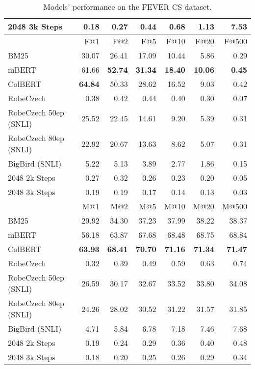 \begin{table}[!htb]
\begin{tabular}{lrrrrrr}
\nystr{} 2048 3k Steps &   0.18 &   0.27 &   0.44 &   0.68 &   1.13 &   7.53 \\
        \midrule
              {} &    F@1 &    F@2 &    F@5 &   F@10 &   F@20 &   F@500 \\
        \midrule
                  BM25 &  30.07 &  26.41 &  17.09 &  10.44 &   5.86 &    0.29 \\
                 mBERT &  61.66 &  \bf{52.74} &  \bf{31.34} &  \bf{18.40} &  \bf{10.06} &    \bf{0.45} \\
               ColBERT &  \bf{64.84} &  50.33 &  28.62 &  16.52 &   9.03 &    0.42 \\
             RobeCzech &   0.38 &   0.42 &   0.44 &   0.40 &   0.30 &    0.07 \\
 RobeCzech 50ep (SNLI) &  25.52 &  22.45 &  14.61 &   9.20 &   5.39 &    0.31 \\
 RobeCzech 80ep (SNLI) &  22.92 &  20.67 &  13.63 &   8.62 &   5.07 &    0.31 \\
        BigBird (SNLI) &   5.22 &   5.13 &   3.89 &   2.77 &   1.86 &    0.15 \\
\nystr{} 2048 2k Steps &   0.27 &   0.32 &   0.26 &   0.23 &   0.20 &    0.05 \\
\nystr{} 2048 3k Steps &   0.19 &   0.19 &   0.17 &   0.14 &   0.13 &    0.03 \\
        \midrule
              {} &  M@1 &  M@2 &  M@5 &  M@10 &  M@20 &  M@500 \\
        \midrule
                  BM25 &  29.92 &  34.30 &  37.23 &   37.99 &   38.22 &    38.37 \\
                 mBERT &  56.18 &  63.87 &  67.68 &   68.48 &   68.75 &    68.84 \\
               ColBERT &  \bf{63.93} &  \bf{68.41} &  \bf{70.70} &   \bf{71.16} &   \bf{71.34} &    \bf{71.47} \\
             RobeCzech &   0.32 &   0.39 &   0.49 &    0.59 &    0.63 &     0.74 \\
 RobeCzech 50ep (SNLI) &  26.59 &  30.17 &  32.67 &   33.52 &   33.80 &    34.08 \\
 RobeCzech 80ep (SNLI) &  24.26 &  28.02 &  30.52 &   31.22 &   31.57 &    31.85 \\
        BigBird (SNLI) &   4.71 &   5.84 &   6.78 &    7.18 &    7.46 &     7.68 \\
\nystr{} 2048 2k Steps &   0.19 &   0.24 &   0.29 &    0.36 &    0.40 &     0.48 \\
\nystr{} 2048 3k Steps &   0.18 &   0.20 &   0.25 &    0.26 &    0.29 &     0.34 \\
        \bottomrule
        \end{tabular}
    \caption[FEVER CS Metrics]{Models' performance on the FEVER CS dataset.}
    \label{tab:fever_results}
\end{table}

